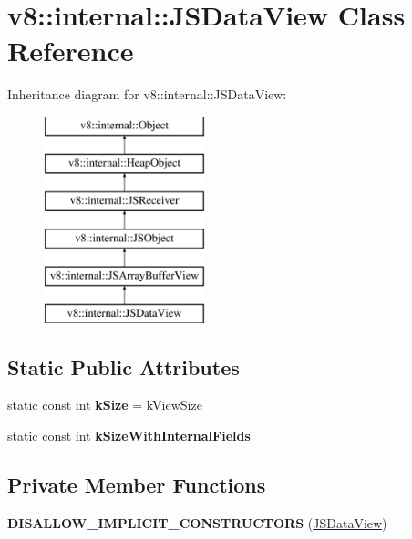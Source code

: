 \hypertarget{classv8_1_1internal_1_1_j_s_data_view}{}\section{v8\+:\+:internal\+:\+:J\+S\+Data\+View Class Reference}
\label{classv8_1_1internal_1_1_j_s_data_view}
Inheritance diagram for v8\+:\+:internal\+:\+:J\+S\+Data\+View\+:\begin{figure}[H]
\begin{center}
\leavevmode
\includegraphics[height=6.000000cm]{classv8_1_1internal_1_1_j_s_data_view}
\end{center}
\end{figure}
\subsection*{Static Public Attributes}
\begin{DoxyCompactItemize}
\item 
static const int {\bfseries k\+Size} = k\+View\+Size\hypertarget{classv8_1_1internal_1_1_j_s_data_view_a914d13be758fc3686220d32599940b73}{}\label{classv8_1_1internal_1_1_j_s_data_view_a914d13be758fc3686220d32599940b73}

\item 
static const int {\bfseries k\+Size\+With\+Internal\+Fields}
\end{DoxyCompactItemize}
\subsection*{Private Member Functions}
\begin{DoxyCompactItemize}
\item 
{\bfseries D\+I\+S\+A\+L\+L\+O\+W\+\_\+\+I\+M\+P\+L\+I\+C\+I\+T\+\_\+\+C\+O\+N\+S\+T\+R\+U\+C\+T\+O\+RS} (\hyperlink{classv8_1_1internal_1_1_j_s_data_view}{J\+S\+Data\+View})\hypertarget{classv8_1_1internal_1_1_j_s_data_view_a3e2138f8fe389ff2f0a163bd4acb6867}{}\label{classv8_1_1internal_1_1_j_s_data_view_a3e2138f8fe389ff2f0a163bd4acb6867}

\end{DoxyCompactItemize}
